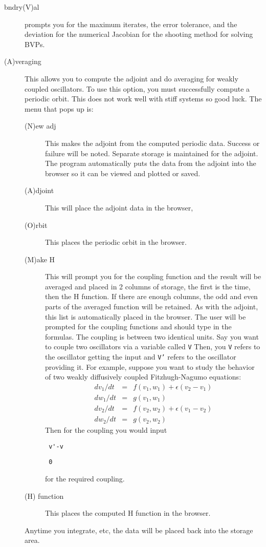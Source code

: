 \documentclass{article}
\newcommand{\beqa}{\begin{eqnarray}}
\newcommand{\eeqa}{\end{eqnarray}}
\newcommand{\bvb}{\begin{verbatim}}
\newcommand{\tc}[1]{\addcontentsline{toc}{subsection}{#1}}
\begin{document}
\begin{description}
\item[bndry(V)al] prompts you for the maximum iterates, the error tolerance, and the
 deviation for the numerical Jacobian for the shooting method for solving BVPs.
\tc{Averaging}\item[(A)veraging]  This allows you to compute the adjoint and do averaging for weakly
 coupled oscillators.  To use this option, you must successfully compute
 a periodic orbit.
 This does not
work well with stiff systems so good luck. The menu that pops up is:
\begin{description}
	\item[(N)ew adj]  This makes the adjoint from the computed periodic
 data.  Success or failure will be noted. Separate storage is
maintained for the adjoint.  The program automatically puts the data
from the adjoint into  the browser so it can be viewed and plotted or
saved. 
\item[(A)djoint]  This will place the adjoint data in the browser,
\item[(O)rbit]  This places the periodic orbit in the browser.
\item[(M)ake H] This will prompt you for the coupling function and the result
 will be averaged and placed in 2 columns of storage, the first is the time, 
then the H function. If there are enough columns, the odd and even
parts of the averaged function will be retained. As with the adjoint,
this list is automatically placed in the browser.  
The user will be prompted for the coupling functions and 
should type in the formulas. The coupling is between two identical
units.  Say you want to couple two oscillators via a variable called
{\tt V} Then, you {\tt V} refers to the oscillator getting the input
and {\tt V'} refers to the oscillator providing it.
  For example, suppose you want to study
the behavior of two weakly diffusively coupled Fitzhugh-Nagumo
equations:
\beqa
	dv_1/dt &=& f(v_1,w_1)+\epsilon (v_2-v_1) \\
	dw_1/dt &=& g(v_1,w_1) \\
	dv_2/dt &=& f(v_2,w_2)+\epsilon (v_1-v_2) \\
	dw_2/dt &=& g(v_2,w_2) 
\eeqa
Then for the coupling you would input
\bvb
 v'-v
\end{verbatim}
\bvb
 0
\end{verbatim}
for the required coupling.  

\item[(H) function]  This places the computed H function in the browser.
\end{description}
Anytime you integrate, etc, the data will be placed back into the storage area.
\end{description}
\end{document}
